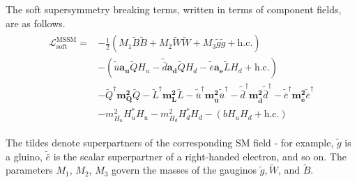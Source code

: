 The soft supersymmetry breaking terms, written in terms of component fields, are as follows.
\begin{align*}
  \begin{split}
    \mathcal{L}_\text{soft}^\text{MSSM} = &-\frac{1}{2}\left(M_1\widetilde{B}\widetilde{B}+
    M_2\widetilde{W}\widetilde{W} + M_3\widetilde{g}\widetilde{g} + \text{h.c.}\right)\\
    &-\left(\widetilde{\overline{u}}\mathbf{a_u}\widetilde{Q}H_u-
    \widetilde{\overline{d}}\mathbf{a_d}\widetilde{Q}H_d-
    \widetilde{\overline{e}}\mathbf{a_e}\widetilde{L}H_d+\text{h.c.}\right)\\
    &-\widetilde{Q}^\dagger\mathbf{m_Q^2}\widetilde{Q}
     -\widetilde{L}^\dagger\mathbf{m_L^2}\widetilde{L}
     -\widetilde{\overline{u}}^\dagger\mathbf{m_{\overline{u}}^2}\widetilde{\overline{u}}^\dagger
     -\widetilde{\overline{d}}^\dagger\mathbf{m_{\overline{d}}^2}\widetilde{\overline{d}}^\dagger
     -\widetilde{\overline{e}}^\dagger\mathbf{m_{\overline{e}}^2}\widetilde{\overline{e}}^\dagger\\
     &-m^2_{H_u}H^*_uH_u-m^2_{H_d}H_d^*H_d-(bH_uH_d+\text{h.c.}) 
  \end{split}
\end{align*}

The tildes denote superpartners of the corresponding SM field - for example, $\widetilde{g}$ is a gluino, $\widetilde{\bar{e}}$ is the scalar superpartner of a right-handed electron, and so on. The parameters $M_1$, $M_2$, $M_3$ govern the masses of the gauginos $\widetilde{g}, \widetilde{W}$, and $\widetilde{B}$.

